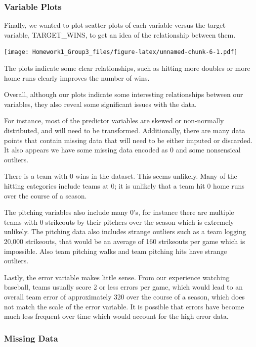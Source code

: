 \documentclass[
]{article}
\begin{document}
\hypertarget{variable-plots}{%
\subsubsection{Variable Plots}\label{variable-plots}}

Finally, we wanted to plot scatter plots of each variable versus the
target variable, TARGET\_WINS, to get an idea of the relationship
between them.

\texttt{[image: Homework1\_Group3\_files/figure-latex/unnamed-chunk-6-1.pdf]}

The plots indicate some clear relationships, such as hitting more
doubles or more home runs clearly improves the number of wins.

Overall, although our plots indicate some interesting relationships
between our variables, they also reveal some significant issues with the
data.

For instance, most of the predictor variables are skewed or non-normally
distributed, and will need to be transformed. Additionally, there are
many data points that contain missing data that will need to be either
imputed or discarded. It also appears we have some missing data encoded
as 0 and some nonsensical outliers.

There is a team with 0 wins in the dataset. This seems unlikely. Many of
the hitting categories include teams at 0; it is unlikely that a team
hit 0 home runs over the course of a season.

The pitching variables also include many 0's, for instance there are
multiple teams with 0 strikeouts by their pitchers over the season which
is extremely unlikely. The pitching data also includes strange outliers
such as a team logging 20,000 strikeouts, that would be an average of
160 strikeouts per game which is impossible. Also team pitching walks
and team pitching hits have strange outliers.

Lastly, the error variable makes little sense. From our experience
watching baseball, teams usually score 2 or less errors per game, which
would lead to an overall team error of approximately 320 over the course
of a season, which does not match the scale of the error variable. It is
possible that errors have become much less frequent over time which
would account for the high error data.

\hypertarget{missing-data}{%
\subsubsection{Missing Data}\label{missing-data}}
\end{document}
